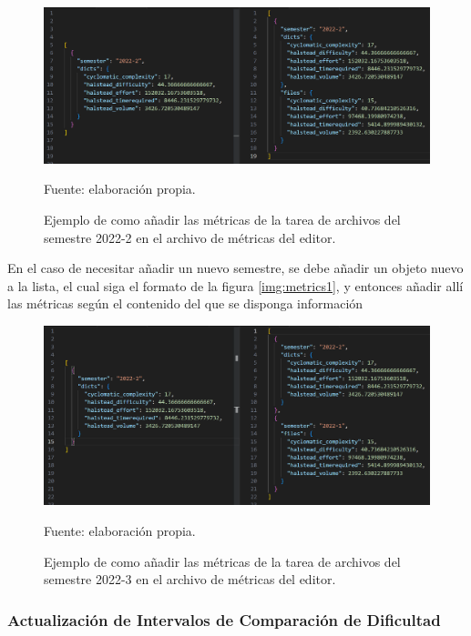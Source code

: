\documentclass[letterpaper,12pt]{article}
\begin{document}
\begin{figure}[H]
  \centering
  \includegraphics[width=1\textwidth]{figures/metrics2.png}
  \caption{Ejemplo de como añadir las métricas de la tarea de archivos del semestre 2022-2 en el archivo de métricas del editor.} Fuente: elaboración propia.
  \label{img:metrics2}
\end{figure}
En el caso de necesitar añadir un nuevo semestre, se debe añadir un objeto nuevo a la lista, el cual siga el formato de la figura \ref{img:metrics1}, y entonces añadir allí las métricas según el contenido del que se disponga información
\begin{figure}[H]
  \centering
  \includegraphics[width=1\textwidth]{figures/metrics3.png}
  \caption{Ejemplo de como añadir las métricas de la tarea de archivos del semestre 2022-3 en el archivo de métricas del editor.} Fuente: elaboración propia.
  \label{img:metrics3}
\end{figure}
\subsubsection{Actualización de Intervalos de Comparación de Dificultad} \label{sssec:comparisionIntMod}
\end{document}
